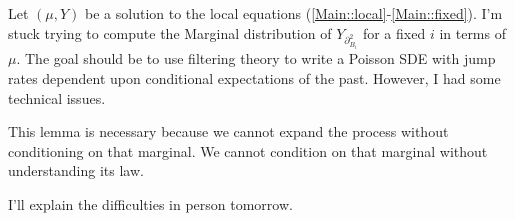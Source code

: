 \documentclass[12pt]{article}
\newcommand{\ind}{\hspace{24pt}}
\newcommand{\vind}[1]{_{#1}}						%
\newcommand{\dneigh}[1]{\partial^2_{#1}}
\newcommand{\Xg}{Y}
\begin{document}
Let \((\mu,\Xg)\) be a solution to the local equations (\eqref{Main::local}-\eqref{Main::fixed}). I'm stuck trying to compute the Marginal distribution of \(\Xg\vind{\dneigh{B_i}}\) for a fixed \(i\) in terms of \(\mu\). The goal should be to use filtering theory to write a Poisson SDE with jump rates dependent upon conditional expectations of the past. However, I had some technical issues.

\ind This lemma is necessary because we cannot expand the process without conditioning on that marginal. We cannot condition on that marginal without understanding its law.

\ind I'll explain the difficulties in person tomorrow.
\newpage


\end{document}
